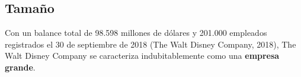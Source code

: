 \subsection{Tamaño}

Con un balance total de 98.598 millones de dólares y 201.000 empleados registrados el 30 de septiembre de 2018 (The Walt Disney Company, 2018), The Walt Disney Company se caracteriza indubitablemente como una \textbf{empresa grande}.
